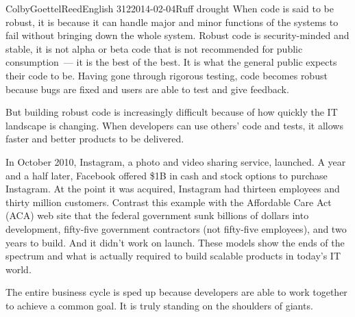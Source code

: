 \documentclass[12pt]{article}
\begin{document}
\begin{mla}{Colby}{Goettel}{Reed}{English 312}{2014-02-04}{Ruff drought}
When code is said to be robust, it is because it can handle major and minor functions of the systems to fail without bringing down the whole system. Robust code is security-minded and stable, it is not alpha or beta code that is not recommended for public consumption~--- it is the best of the best. It is what the general public expects their code to be. Having gone through rigorous testing, code becomes robust because bugs are fixed and users are able to test and give feedback.

But building robust code is increasingly difficult because of how quickly the IT landscape is changing. When developers can use others' code and tests, it allows faster and better products to be delivered.

In October 2010, Instagram, a photo and video sharing service, launched. A year and a half later, Facebook offered \$1B in cash and stock options to purchase Instagram. At the point it was acquired, Instagram had thirteen employees and thirty million customers. Contrast this example with the Affordable Care Act (ACA) web site that the federal government sunk billions of dollars into development, fifty-five government contractors (not fifty-five employees), and two years to build. And it didn't work on launch. These models show the ends of the spectrum and what is actually required to build scalable products in today's IT world.









The entire business cycle is sped up because developers are able to work together to achieve a common goal. It is truly standing on the shoulders of giants.

\end{mla}
\end{document}
